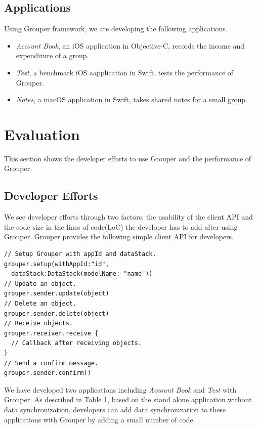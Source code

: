 \documentclass[twocolumn,10pt]{article}
\begin{document}
\subsection{Applications}

Using Grouper framework, we are developing the following applications. 

\begin{itemize}
	\setlength{\itemsep}{1pt}
	\setlength{\parskip}{0pt}
	\setlength{\parsep}{0pt}
	\item \emph{Account Book}, an iOS application in Objective-C, records the income and expenditure of a group.
	\item \emph{Test}, a benchmark iOS aapplication in Swift, tests the performance of Grouper.
	\item \emph{Notes}, a macOS application in Swift, takes shared notes for a small group.
\end{itemize}

\section{Evaluation}

This section shows the developer efforts to use Grouper and the performance of Grouper.

\subsection{Developer Efforts}

We see developer efforts through two factors: the usability of the client API and the code size in the lines of code(LoC) the developer has to add after using Grouper. 
Grouper provides the following simple client API for developers.

\begin{lstlisting}
// Setup Grouper with appId and dataStack.
grouper.setup(withAppId:"id",
  dataStack:DataStack(modelName: "name"))
// Update an object.
grouper.sender.update(object)
// Delete an object.
grouper.sender.delete(object)
// Receive objects.
grouper.receiver.receive { 
  // Callback after receiving objects.
}
// Send a confirm message.
grouper.sender.confirm()
\end{lstlisting}

We have developed two applications including \emph{Account Book} and \emph{Test} with Grouper. 
As described in Table 1, based on the stand alone application without data synchronization, developers can add data synchronization to these applications with Grouper by adding a small number of code. 
\end{document}
